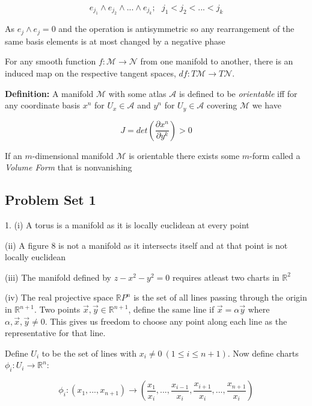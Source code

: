 \documentclass{article}\usepackage[]{graphicx}\usepackage[]{color}
\newcommand{\M}{\mathcal{M}}
\begin{document}
$$
e_{j_1}\wedge e_{j_2}\wedge... \wedge e_{j_k}; \ \ \ j_1 < j_2<...<j_k
$$

As $e_j\wedge e_j=0$ and the operation is antisymmetric so any rearrangement of the same basis elements is at most changed by a negative phase


For any smooth function $f:\M\rightarrow\mathcal{N}$ from one manifold to another, there is an induced map on the respective tangent spaces, $df:T\M\rightarrow T\mathcal{N}$.

\begin{center}



\end{center}

\textbf{Definition:} A manifold $\M$ with some atlas $\mathcal{A}$ is defined to be \textit{orientable} iff for any coordinate basis $x^n$ for $U_x \in\mathcal{A}$ and $y^n$ for $U_y \in\mathcal{A}$ covering $\M$ we have

$$
J=det\left( \frac{\partial x^n}{\partial y^k} \right)>0
$$ 
 
 
If an $m$-dimensional manifold $\M$ is orientable there exists some $m$-form called a \textit{Volume Form} that is nonvanishing  
 
\pagebreak



\subsection{Problem Set 1}


1. (i) A torus is a manifold as it is locally euclidean at every point

(ii) A figure 8 is not a manifold as it intersects itself and at that point is not locally euclidean 

(iii) The manifold defined by $z-x^2-y^2=0$ requires atleast two charts in $\mathbb{R}^2$

(iv) The real projective space $\mathbb{R}P^n$ is the set of all lines passing through the origin in $\mathbb{R}^{n+1}$. Two points $\vec{x},\vec{y}\in\mathbb{R}^{n+1}$, define the same line if $\vec{x}=\alpha\vec{y}$ where $\alpha,\vec{x},\vec{y}\neq 0$. This gives us freedom to choose any point along each line as the representative for that line. 

Define $U_i$ to be the set of lines with $x_i\neq 0 \ (1\leq i\leq n+1)$. Now define charts $\phi_i:U_i\rightarrow \mathbb{R}^n$:

$$
\phi_i: (x_1,...,x_{n+1})\rightarrow \left(\frac{x_1}{x_i},...,\frac{x_{i-1}}{x_i},\frac{x_{i+1}}{x_i},...,\frac{x_{n+1}}{x_i}\right)
$$ 
\end{document}
